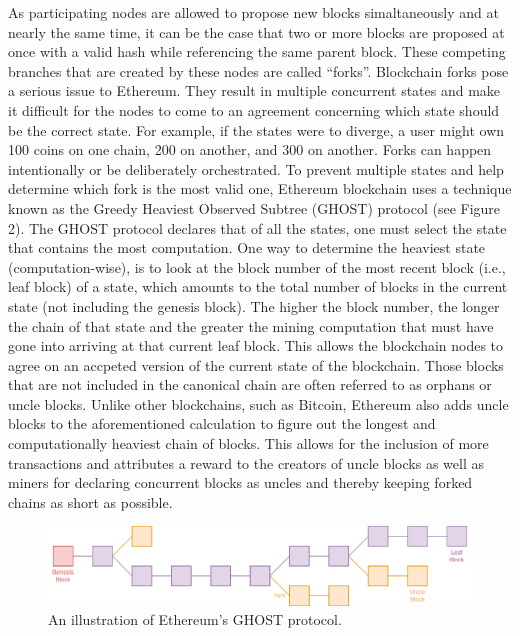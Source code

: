     As participating nodes are allowed to propose new blocks simaltaneously and at nearly the same time, it can be the case that two or more blocks are proposed at once with a valid hash while referencing the same parent block.
    These competing branches that are created by these nodes are called “forks”.
    Blockchain forks pose a serious issue to Ethereum.
    They result in multiple concurrent states and make it difficult for the nodes to come to an agreement concerning which state should be the correct state.
    For example, if the states were to diverge, a user might own 100 coins on one chain, 200 on another, and 300 on another.
    Forks can happen intentionally or be deliberately orchestrated.
    To prevent multiple states and help determine which fork is the most valid one, Ethereum blockchain uses a technique known as the Greedy Heaviest Observed Subtree (GHOST) protocol (see Figure 2).
    The GHOST protocol declares that of all the states, one must select the state that contains the most computation.
    One way to determine the heaviest state (computation-wise), is to look at the block number of the most recent block (i.e., leaf block) of a state, which amounts to the total number of blocks in the current state (not including the genesis block).
    The higher the block number, the longer the chain of that state and the greater the mining computation that must have gone into arriving at that current leaf block.
    This allows the blockchain nodes to agree on an accpeted version of the current state of the blockchain.
    Those blocks that are not included in the canonical chain are often referred to as orphans or uncle blocks.
    Unlike other blockchains, such as Bitcoin, Ethereum also adds uncle blocks to the aforementioned calculation to figure out the longest and computationally heaviest chain of blocks.
    This allows for the inclusion of more transactions and attributes a reward to the creators of uncle blocks as well as miners for declaring concurrent blocks as uncles and thereby keeping forked chains as short as possible.

    \begin{figure}
        \centering
        \includegraphics[width=\textwidth]{figures/uncle.png}
        \caption{An illustration of Ethereum's GHOST protocol.}
        \label{fig:uncle}
    \end{figure}

